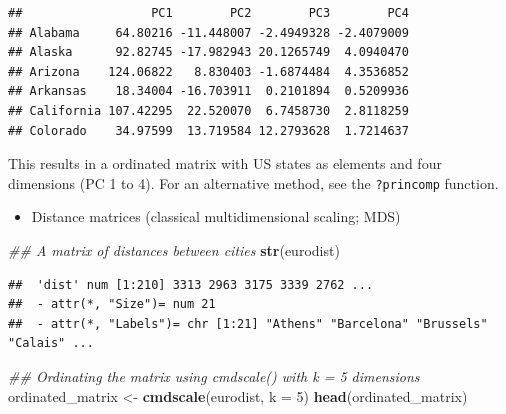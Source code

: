 \documentclass[]{book}
\newenvironment{Shaded}{\begin{snugshade}}{\end{snugshade}}
\newcommand{\CommentTok}[1]{\textcolor[rgb]{0.56,0.35,0.01}{\textit{#1}}}
\newcommand{\DataTypeTok}[1]{\textcolor[rgb]{0.13,0.29,0.53}{#1}}
\newcommand{\DecValTok}[1]{\textcolor[rgb]{0.00,0.00,0.81}{#1}}
\newcommand{\KeywordTok}[1]{\textcolor[rgb]{0.13,0.29,0.53}{\textbf{#1}}}
\newcommand{\NormalTok}[1]{#1}
\newcommand{\OperatorTok}[1]{\textcolor[rgb]{0.81,0.36,0.00}{\textbf{#1}}}
\newcommand{\StringTok}[1]{\textcolor[rgb]{0.31,0.60,0.02}{#1}}
\providecommand{\tightlist}{%
  \setlength{\itemsep}{0pt}\setlength{\parskip}{0pt}}
\begin{document}
\begin{Shaded}
\end{Shaded}

\begin{verbatim}
##                  PC1        PC2        PC3        PC4
## Alabama     64.80216 -11.448007 -2.4949328 -2.4079009
## Alaska      92.82745 -17.982943 20.1265749  4.0940470
## Arizona    124.06822   8.830403 -1.6874484  4.3536852
## Arkansas    18.34004 -16.703911  0.2101894  0.5209936
## California 107.42295  22.520070  6.7458730  2.8118259
## Colorado    34.97599  13.719584 12.2793628  1.7214637
\end{verbatim}

This results in a ordinated matrix with US states as elements and four dimensions (PC 1 to 4). For an alternative method, see the \texttt{?princomp} function.

\begin{itemize}
\tightlist
\item
  Distance matrices (classical multidimensional scaling; MDS)
\end{itemize}

\begin{Shaded}
\begin{Highlighting}[]
\CommentTok{## A matrix of distances between cities}
\KeywordTok{str}\NormalTok{(eurodist)}
\end{Highlighting}
\end{Shaded}

\begin{verbatim}
##  'dist' num [1:210] 3313 2963 3175 3339 2762 ...
##  - attr(*, "Size")= num 21
##  - attr(*, "Labels")= chr [1:21] "Athens" "Barcelona" "Brussels" "Calais" ...
\end{verbatim}

\begin{Shaded}
\begin{Highlighting}[]
\CommentTok{## Ordinating the matrix using cmdscale() with k = 5 dimensions }
\NormalTok{ordinated_matrix <-}\StringTok{ }\KeywordTok{cmdscale}\NormalTok{(eurodist, }\DataTypeTok{k =} \DecValTok{5}\NormalTok{)}
\KeywordTok{head}\NormalTok{(ordinated_matrix)}
\end{Highlighting}
\end{Shaded}
\end{document}
